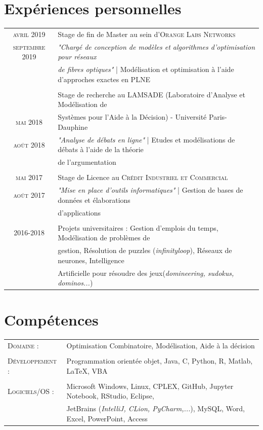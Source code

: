 \documentclass[a4paper,10pt]{article}
\begin{document}
\section{Expériences personnelles}
\begin{tabular}{cl}	
 \textsc{avril} 2019 & Stage de fin de Master au sein d’\textsc{Orange Labs Networks} \\ 
 \textsc{septembre} 2019 & \emph{"Chargé de conception de modèles et algorithmes d'optimisation pour réseaux}\\
 & \emph{de fibres optiques"}\small{ | Modélisation et optimisation à l'aide d'approches exactes en PLNE}\\&\\
 & Stage de recherche au \textsc{LAMSADE} (Laboratoire d'Analyse et Modélisation de\\  \textsc{mai} 2018 & Systèmes pour l'Aide à la Décision) - Université Paris-Dauphine\\
 \textsc{août} 2018 & \emph{"Analyse de débats en ligne"}\small{ | Etudes et modélisations de débats à l'aide de la théorie }\\& \small{de l'argumentation}\\&\\
 \textsc{mai} 2017 & Stage de Licence au \textsc{Crédit Industriel et Commercial}\\
 \textsc{août} 2017 & \emph{"Mise en place d'outils informatiques"}\small{ | Gestion de bases de données et élaborations} \\ &  \small{d'applications}\\&\\
 2016-2018 & Projets universitaires : Gestion d'emplois du temps, Modélisation de problèmes de\\& gestion, Résolution de puzzles (\emph{infinityloop}), Réseaux de neurones, Intelligence \\&Artificielle pour résoudre des jeux(\emph{domineering, sudokus, dominos...})
\end{tabular}

\section{Compétences}
\begin{tabular}{ll}	
\textsc{Domaine :} & Optimisation Combinatoire, Modélisation, Aide à la décision\\&\\
\textsc{Développement :} & Programmation orientée objet, Java, C, Python, R, Matlab, \LaTeX, VBA\\&\\
\textsc{Logiciels/OS :} & Microsoft Windows, Linux, CPLEX, GitHub, Jupyter Notebook, RStudio, Eclipse, \\ & JetBrains (\emph{IntelliJ, CLion, PyCharm,...}), MySQL, Word, Excel, PowerPoint, Access
\end{tabular}
\end{document}
